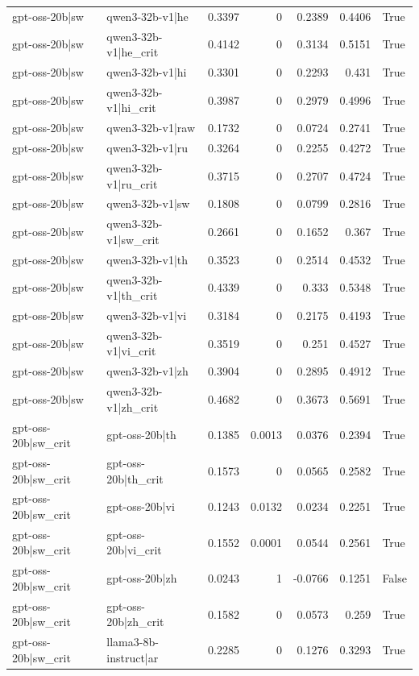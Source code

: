 \begin{table}
\begin{tabular}{l l r r r r l}
gpt-oss-20b|sw & qwen3-32b-v1|he & 0.3397 & 0 & 0.2389 & 0.4406 & True \\
gpt-oss-20b|sw & qwen3-32b-v1|he_crit & 0.4142 & 0 & 0.3134 & 0.5151 & True \\
gpt-oss-20b|sw & qwen3-32b-v1|hi & 0.3301 & 0 & 0.2293 & 0.431 & True \\
gpt-oss-20b|sw & qwen3-32b-v1|hi_crit & 0.3987 & 0 & 0.2979 & 0.4996 & True \\
gpt-oss-20b|sw & qwen3-32b-v1|raw & 0.1732 & 0 & 0.0724 & 0.2741 & True \\
gpt-oss-20b|sw & qwen3-32b-v1|ru & 0.3264 & 0 & 0.2255 & 0.4272 & True \\
gpt-oss-20b|sw & qwen3-32b-v1|ru_crit & 0.3715 & 0 & 0.2707 & 0.4724 & True \\
gpt-oss-20b|sw & qwen3-32b-v1|sw & 0.1808 & 0 & 0.0799 & 0.2816 & True \\
gpt-oss-20b|sw & qwen3-32b-v1|sw_crit & 0.2661 & 0 & 0.1652 & 0.367 & True \\
gpt-oss-20b|sw & qwen3-32b-v1|th & 0.3523 & 0 & 0.2514 & 0.4532 & True \\
gpt-oss-20b|sw & qwen3-32b-v1|th_crit & 0.4339 & 0 & 0.333 & 0.5348 & True \\
gpt-oss-20b|sw & qwen3-32b-v1|vi & 0.3184 & 0 & 0.2175 & 0.4193 & True \\
gpt-oss-20b|sw & qwen3-32b-v1|vi_crit & 0.3519 & 0 & 0.251 & 0.4527 & True \\
gpt-oss-20b|sw & qwen3-32b-v1|zh & 0.3904 & 0 & 0.2895 & 0.4912 & True \\
gpt-oss-20b|sw & qwen3-32b-v1|zh_crit & 0.4682 & 0 & 0.3673 & 0.5691 & True \\
gpt-oss-20b|sw_crit & gpt-oss-20b|th & 0.1385 & 0.0013 & 0.0376 & 0.2394 & True \\
gpt-oss-20b|sw_crit & gpt-oss-20b|th_crit & 0.1573 & 0 & 0.0565 & 0.2582 & True \\
gpt-oss-20b|sw_crit & gpt-oss-20b|vi & 0.1243 & 0.0132 & 0.0234 & 0.2251 & True \\
gpt-oss-20b|sw_crit & gpt-oss-20b|vi_crit & 0.1552 & 0.0001 & 0.0544 & 0.2561 & True \\
gpt-oss-20b|sw_crit & gpt-oss-20b|zh & 0.0243 & 1 & -0.0766 & 0.1251 & False \\
gpt-oss-20b|sw_crit & gpt-oss-20b|zh_crit & 0.1582 & 0 & 0.0573 & 0.259 & True \\
gpt-oss-20b|sw_crit & llama3-8b-instruct|ar & 0.2285 & 0 & 0.1276 & 0.3293 & True \\

\end{tabular}
\end{table}
